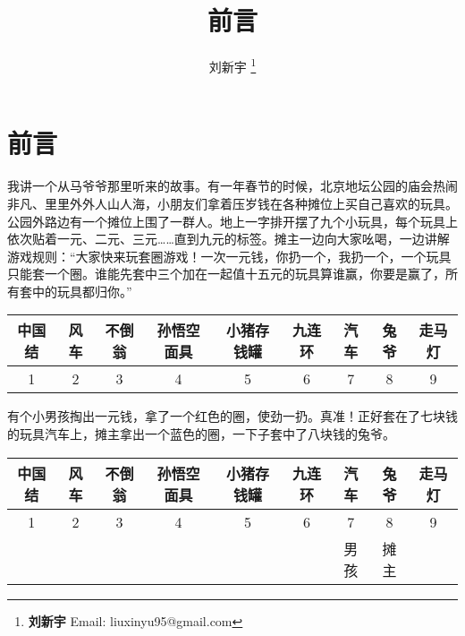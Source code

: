 \documentclass[UTF8]{article}
\begin{document}
\title{前言}

\author{刘新宇
\thanks{{\bfseries 刘新宇} \newline
  Email: liuxinyu95@gmail.com \newline}
  }

\maketitle
\fi


\chapter*{前言}

我讲一个从马爷爷那里听来的故事。有一年春节的时候，北京地坛公园的庙会热闹非凡、里里外外人山人海，小朋友们拿着压岁钱在各种摊位上买自己喜欢的玩具。公园外路边有一个摊位上围了一群人。地上一字排开摆了九个小玩具，每个玩具上依次贴着一元、二元、三元……直到九元的标签。摊主一边向大家吆喝，一边讲解游戏规则：“大家快来玩套圈游戏！一次一元钱，你扔一个，我扔一个，一个玩具只能套一个圈。谁能先套中三个加在一起值十五元的玩具算谁赢，你要是赢了，所有套中的玩具都归你。”

\vspace{5mm}
\begin{adjustbox}{max width=\textwidth}
\begin{tabular}{|c|c|c|c|c|c|c|c|c|}
\hline
中国结 & 风车 & 不倒翁 & 孙悟空面具 & 小猪存钱罐 & 九连环 & 汽车 & 兔爷 & 走马灯 \\
\hline
1 & 2 & 3 & 4 & 5 & 6 & 7 & 8 & 9 \\
\hline
\end{tabular}
\end{adjustbox}
\vspace{5mm}

有个小男孩掏出一元钱，拿了一个红色的圈，使劲一扔。真准！正好套在了七块钱的玩具汽车上，摊主拿出一个蓝色的圈，一下子套中了八块钱的兔爷。

\vspace{5mm}
\begin{adjustbox}{max width=\textwidth}
\begin{tabular}{|c|c|c|c|c|c|c|c|c|}
\hline
中国结 & 风车 & 不倒翁 & 孙悟空面具 & 小猪存钱罐 & 九连环 & 汽车 & 兔爷 & 走马灯 \\
\hline
1 & 2 & 3 & 4 & 5 & 6 & 7 & 8 & 9 \\
\hline
  &   &   &   &   &   & 男孩 & 摊主 & \\
\hline
\end{tabular}
\end{adjustbox}
\vspace{5mm}
\end{document}

